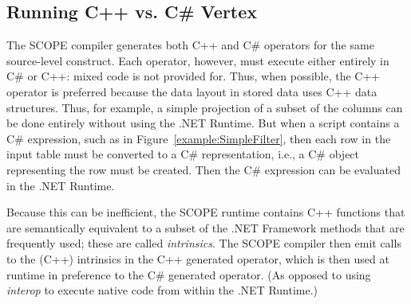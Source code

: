 \subsection{Running C++ vs. C\# Vertex}
The SCOPE compiler generates both C++ and C\# operators for the same source-level construct.
Each operator, however, must execute either entirely in C\# or C++: mixed code is not provided for.
Thus, when possible, the C++ operator is preferred because the data layout in stored data uses C++ data structures.
Thus, for example, a simple projection of a subset of the columns can be done entirely
without using the .NET Runtime.
But when a script contains a C\# expression, such as in Figure~\ref{example:SimpleFilter}, then
each row in the input table must be converted to a C\# representation, i.e., a C\# object representing
the row must be created.
Then the C\# expression can be evaluated in the .NET Runtime.

Because this can be inefficient, the SCOPE runtime contains C++ functions that are semantically
equivalent to a subset of the .NET Framework methods that are frequently used; these are called
{\it intrinsics}.
The SCOPE compiler then emit calls to the (C++) intrinsics in the C++ generated operator, which is
then used at runtime in preference to the C\# generated operator.
(As opposed to using {\it interop} to execute native code from within the .NET Runtime.)


